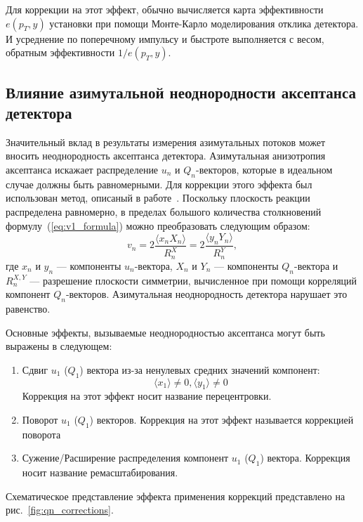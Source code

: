 Для коррекции на этот эффект, обычно вычисляется карта эффективности $e(p_T, y)$ установки при помощи Монте-Карло моделирования отклика детектора.
И усреднение по поперечному импульсу и быстроте выполняется с весом, обратным эффективности $1/e(p_T, y)$.

\subsection{Влияние азимутальной неоднородности аксептанса детектора}

Значительный вклад в результаты измерения азимутальных потоков может вносить неоднородность аксептанса детектора. 
Азимутальная анизотропия аксептанса искажает распределение $u_n$  и $Q_n$-векторов, которые в идеальном случае должны быть равномерными. 
Для коррекции этого эффекта был использован метод, описаный в работе~\cite{Selyuzhenkov:2007zi}.
Поскольку плоскость реакции распределена равномерно, в пределах большого количества столкновений формулу~(\ref{eq:v1_formula}) можно преобразовать следующим образом:
%
\begin{equation}
    v_n =  2\frac{ \langle x_n X_n \rangle }{R_n^X} = 2\frac{ \langle y_n Y_n \rangle }{R_n^Y},
    \label{eq:v1_formula}
\end{equation}
%
где $x_n$ и $y_n$ --- компоненты $u_n$-вектора, $X_n$ и $Y_n$ --- компоненты $Q_n$-вектора и $R_n^{X,Y}$ --- разрешение плоскости симметрии, вычисленное при помощи корреляций компонент $Q_n$-векторов.
Азимутальная неоднородность детектора нарушает это равенство.

Основные эффекты, вызываемые неоднородностью аксептанса могут быть выражены в следующем:
\begin{enumerate}
    \item Сдвиг $u_1$ ($Q_1$) вектора из-за ненулевых средних значений компонент:
    \begin{equation}
        \langle x_1 \rangle \ne 0, \langle y_1 \rangle \ne 0
    \end{equation}
    Коррекция на этот эффект носит название перецентровки.
    \item Поворот $u_1$ ($Q_1$) векторов. Коррекция на этот эффект называется коррекцией поворота
    \item Сужение/Расширение распределения компонент $u_1$ ($Q_1$) вектора. Коррекция носит название ремасштабирования.
\end{enumerate}
Схематическое представление эффекта применения коррекций представлено на рис.~\ref{fig:qn_corrections}.


